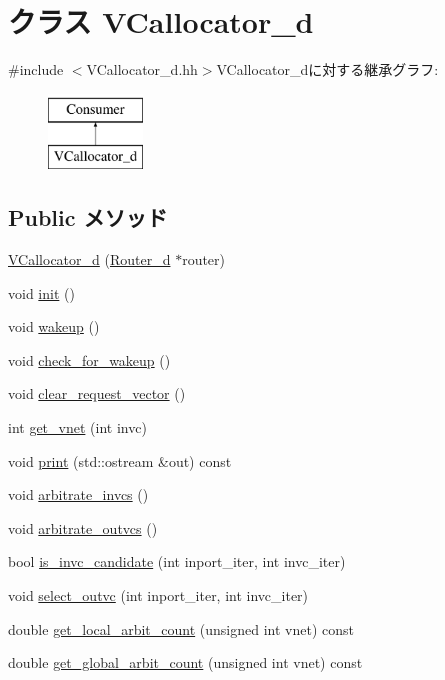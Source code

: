 \hypertarget{classVCallocator__d}{
\section{クラス VCallocator\_\-d}
\label{classVCallocator__d}
}


{\ttfamily \#include $<$VCallocator\_\-d.hh$>$}VCallocator\_\-dに対する継承グラフ:\begin{figure}[H]
\begin{center}
\leavevmode
\includegraphics[height=2cm]{classVCallocator__d}
\end{center}
\end{figure}
\subsection*{Public メソッド}
\begin{DoxyCompactItemize}
\item 
\hyperlink{classVCallocator__d_a46ce1e39ce6dcbf532f3ec6bf6beceb3}{VCallocator\_\-d} (\hyperlink{classRouter__d}{Router\_\-d} $\ast$router)
\item 
void \hyperlink{classVCallocator__d_a02fd73d861ef2e4aabb38c0c9ff82947}{init} ()
\item 
void \hyperlink{classVCallocator__d_ae674290a26ecbd622c5160e38e8a4fe9}{wakeup} ()
\item 
void \hyperlink{classVCallocator__d_a3312235aad1a35d2eb8dfe6b3a93d880}{check\_\-for\_\-wakeup} ()
\item 
void \hyperlink{classVCallocator__d_ac8b7aea8034854f208223b1c36fe1b68}{clear\_\-request\_\-vector} ()
\item 
int \hyperlink{classVCallocator__d_afdff1bb4dda9168cb4bf8b78aa0cf9d8}{get\_\-vnet} (int invc)
\item 
void \hyperlink{classVCallocator__d_ac55fe386a101fbae38c716067c9966a0}{print} (std::ostream \&out) const 
\item 
void \hyperlink{classVCallocator__d_a01375ae0acbd600860e255ee14aff73c}{arbitrate\_\-invcs} ()
\item 
void \hyperlink{classVCallocator__d_afe82cf170836278a70414a8f02ce6980}{arbitrate\_\-outvcs} ()
\item 
bool \hyperlink{classVCallocator__d_adb47909581756985840bfc56ab905702}{is\_\-invc\_\-candidate} (int inport\_\-iter, int invc\_\-iter)
\item 
void \hyperlink{classVCallocator__d_ab7aae435497572df5d64fe006f34ca7a}{select\_\-outvc} (int inport\_\-iter, int invc\_\-iter)
\item 
double \hyperlink{classVCallocator__d_ab4f94aa84ae81a16726cdb768dec7048}{get\_\-local\_\-arbit\_\-count} (unsigned int vnet) const 
\item 
double \hyperlink{classVCallocator__d_a26898553ccbde5e4d6e3c339788bdf5a}{get\_\-global\_\-arbit\_\-count} (unsigned int vnet) const 
\end{DoxyCompactItemize}
